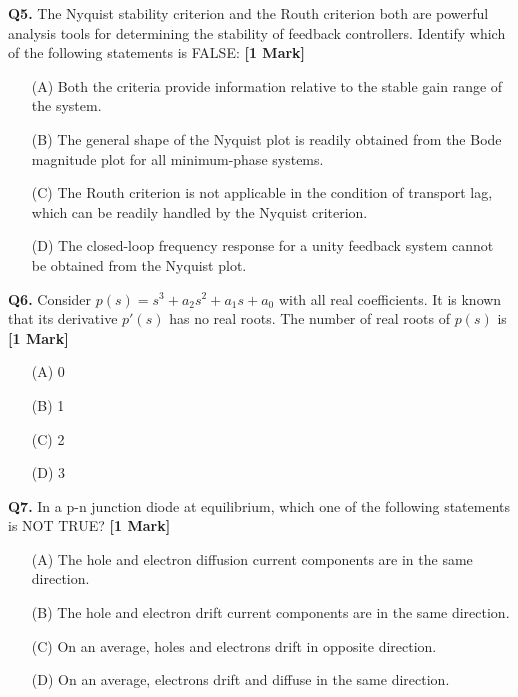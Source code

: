 \documentclass[11pt]{article}
\newcommand{\questiona}[2]{
    \noindent\textbf{Q#2.} #1 \hfill \textbf{[1 Mark]}
}
\begin{document}
\vspace{0.5cm}

\questiona{The Nyquist stability criterion and the Routh criterion both are powerful analysis tools for determining the stability of feedback controllers. Identify which of the following statements is FALSE:}{5}
\begin{enumerate}
    \item[(A)] Both the criteria provide information relative to the stable gain range of the system.
    \item[(B)] The general shape of the Nyquist plot is readily obtained from the Bode magnitude plot for all minimum-phase systems.
    \item[(C)] The Routh criterion is not applicable in the condition of transport lag, which can be readily handled by the Nyquist criterion.
    \item[(D)] The closed-loop frequency response for a unity feedback system cannot be obtained from the Nyquist plot.
\end{enumerate}

\vspace{0.5cm}

\questiona{Consider \( p(s) = s^3 + a_2s^2 + a_1s + a_0 \) with all real coefficients. It is known that its derivative \( p'(s) \) has no real roots. The number of real roots of \( p(s) \) is}{6}
\begin{enumerate}
    \item[(A)] 0
    \item[(B)] 1
    \item[(C)] 2
    \item[(D)] 3
\end{enumerate}

\vspace{0.5cm}

\questiona{In a p-n junction diode at equilibrium, which one of the following statements is NOT TRUE?}{7}
\begin{enumerate}
    \item[(A)] The hole and electron diffusion current components are in the same direction.
    \item[(B)] The hole and electron drift current components are in the same direction.
    \item[(C)] On an average, holes and electrons drift in opposite direction.
    \item[(D)] On an average, electrons drift and diffuse in the same direction.
\end{enumerate}
\end{document}
